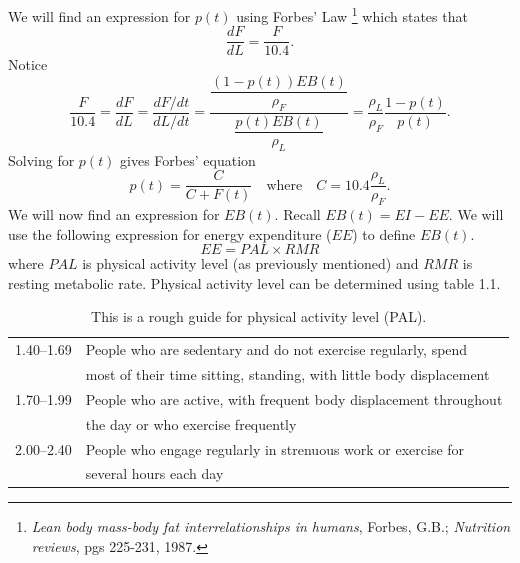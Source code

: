 We will find an expression for $p(t)$ using Forbes' Law%
 \footnote{\emph{Lean body mass-body fat interrelationships in humans}, Forbes, G.B.; \emph{ Nutrition reviews}, pgs 225-231, 1987.}
which states that $$\frac{dF}{dL}=\frac{F}{10.4}.$$ Notice
\[
\dfrac{F}{10.4} = \dfrac{dF}{dL} = \dfrac{dF/dt}{dL/dt} = \dfrac{\dfrac{(1-p(t)) EB(t)}{\rho_F}}{\dfrac{p(t) EB(t)}{\rho_L}} = \dfrac{\rho_L}{\rho_F} \dfrac{1-p(t)}{p(t)}.
\]
Solving for $p(t)$ gives Forbes' equation
\begin{equation}
\label{eqn:Forbes2}
p(t) = \dfrac{C}{C+F(t)}\quad\mbox{where}\quad C=10.4\dfrac{\rho_L}{\rho_F}.
\end{equation}
We will now find an expression for $EB(t)$. Recall $EB(t)=EI-EE$. We will use the following expression for energy expenditure ($EE$) to define $EB(t)$. 
\begin{equation}
\label{eqn:EE1}
EE=PAL \times RMR
\end{equation}
where $PAL$ is physical activity level (as previously mentioned) and $RMR$ is resting metabolic rate. 
Physical activity level can be determined using table 1.1.
\begin{table}[h]
\begin{center}
\begin{tabular}{|l|l|}
\hline
1.40--1.69 & People who are sedentary and do not exercise regularly, spend \\
& most of their time sitting, standing, with little body displacement
\\
\hline
1.70--1.99 & People who are active, with frequent body displacement throughout  \\
& the day or who exercise frequently\\
\hline
2.00--2.40 & People who engage regularly in strenuous work or exercise for \\
& several hours each day\\
\hline
\end{tabular}
\caption{This is a rough guide for physical activity level (PAL).
}
\end{center}\label{tab:PAL_table}
\end{table}

